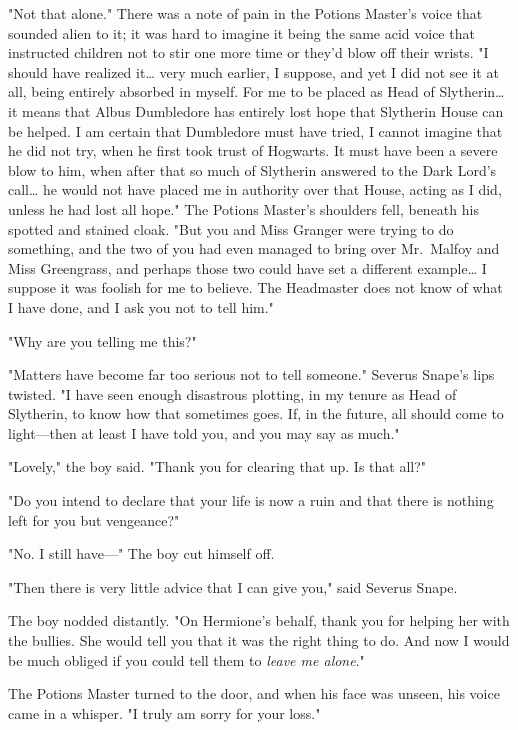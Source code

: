 "Not that alone." There was a note of pain in the Potions Master's voice that
sounded alien to it; it was hard to imagine it being the same acid voice that
instructed children not to stir one more time or they'd blow off their wrists.
"I should have realized it{\ldots} very much earlier, I suppose, and yet I did
not see it at all, being entirely absorbed in myself. For me to be placed as
Head of Slytherin{\ldots} it means that Albus Dumbledore has entirely lost hope
that Slytherin House can be helped. I am certain that Dumbledore must have
tried, I cannot imagine that he did not try, when he first took trust of
Hogwarts. It must have been a severe blow to him, when after that so much of
Slytherin answered to the Dark Lord's call{\ldots} he would not have placed me
in authority over that House, acting as I did, unless he had lost all hope."
The Potions Master's shoulders fell, beneath his spotted and stained cloak.
"But you and Miss Granger were trying to do something, and the two of you had
even managed to bring over Mr.~Malfoy and Miss Greengrass, and perhaps those
two could have set a different example{\ldots} I suppose it was foolish for me
to believe. The Headmaster does not know of what I have done, and I ask you not
to tell him."

"Why are you telling me this?"

"Matters have become far too serious not to tell someone." Severus Snape's lips
twisted. "I have seen enough disastrous plotting, in my tenure as Head of
Slytherin, to know how that sometimes goes. If, in the future, all should come
to light---then at least I have told you, and you may say as much."

"Lovely," the boy said. "Thank you for clearing that up. Is that all?"

"Do you intend to declare that your life is now a ruin and that there is
nothing left for you but vengeance?"

"No. I still have---" The boy cut himself off.

"Then there is very little advice that I can give you," said Severus Snape.

The boy nodded distantly. "On Hermione's behalf, thank you for helping her with
the bullies. She would tell you that it was the right thing to do. And now I
would be much obliged if you could tell them to \emph{leave me alone}."

The Potions Master turned to the door, and when his face was unseen, his voice
came in a whisper. "I truly am sorry for your loss."

